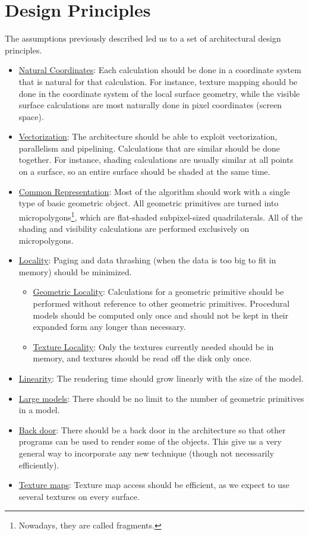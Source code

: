 \section{Design Principles}
The assumptions previously described led us to a set of architectural design principles.
\begin{itemize}
    \item \ul{Natural Coordinates}: Each calculation should be done in a coordinate system that is natural for that calculation. For instance, texture mapping should be done in the coordinate system of the local surface geometry, while the visible surface calculations are most naturally done in pixel coordinates (screen space).
    \item \ul{Vectorization}: The architecture should be able to exploit vectorization, parallelism and pipelining. Calculations that are similar should be done together. For instance, shading calculations are usually similar at all points on a surface, so an entire surface should be shaded at the same time.
    \item \ul{Common Representation}: Most of the algorithm should work with a single type of basic geometric object. All geometric primitives are turned into micropolygons\footnote{Nowadays, they are called fragments.}, which are flat-shaded subpixel-sized quadrilaterals. All of the shading and visibility calculations are performed exclusively on micropolygons.
    \item \ul{Locality}: Paging and data thrashing (when the data is too big to fit in memory) should be minimized.
    \begin{itemize}
        \item \ul{Geometric Locality}: Calculations for a geometric primitive should be performed without reference to other geometric primitives. Procedural models should be computed only once and should not be kept in their expanded form any longer than necessary.
        \item \ul{Texture Locality}: Only the textures currently needed should be in memory, and textures should be read off the disk only once.
    \end{itemize}
    \item \ul{Linearity}: The rendering time should grow linearly with the size of the model.
    \item \ul{Large models}: There should be no limit to the number of geometric primitives in a model.
    \item \ul{Back door}: There should be a back door in the architecture so that other programs can be used to render some of the objects. This give us a very general way to incorporate any new technique (though not necessarily efficiently).
    \item \ul{Texture maps}: Texture map access should be efficient, as we expect to use several textures on every surface.
\end{itemize}

